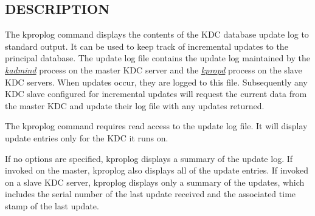 \documentclass[letterpaper,10pt,english]{sphinxmanual}
\begin{document}
\subsection{DESCRIPTION}
\label{admin/admin_commands/kproplog:description}
The kproplog command displays the contents of the KDC database update
log to standard output.  It can be used to keep track of incremental
updates to the principal database.  The update log file contains the
update log maintained by the {\hyperref[admin/admin_commands/kadmind:kadmind-8]{\emph{kadmind}}} process on the master
KDC server and the {\hyperref[admin/admin_commands/kpropd:kpropd-8]{\emph{kpropd}}} process on the slave KDC servers.
When updates occur, they are logged to this file.  Subsequently any
KDC slave configured for incremental updates will request the current
data from the master KDC and update their log file with any updates
returned.

The kproplog command requires read access to the update log file.  It
will display update entries only for the KDC it runs on.

If no options are specified, kproplog displays a summary of the update
log.  If invoked on the master, kproplog also displays all of the
update entries.  If invoked on a slave KDC server, kproplog displays
only a summary of the updates, which includes the serial number of the
last update received and the associated time stamp of the last update.
\end{document}
